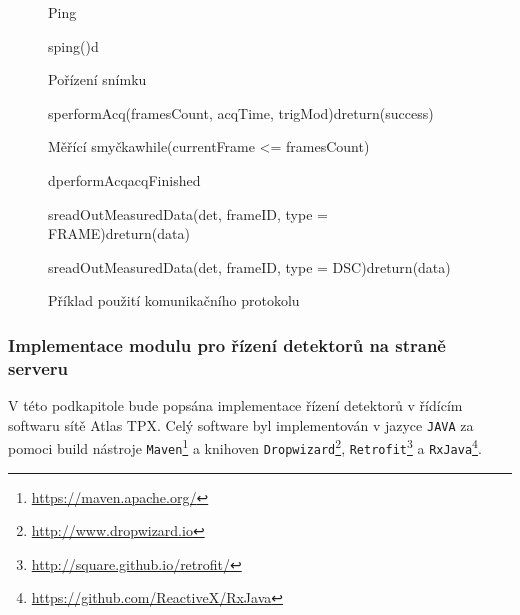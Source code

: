 \begin{figure}[t]
	\begin{center}
		\begin{sequencediagram}
			\begin{sdblock}{Ping}{}
				\begin{call}{s}{ping()}{d}{}
				\end{call}
			\end{sdblock}
			\begin{sdblock}{Pořízení snímku}{}
				\begin{call}{s}{performAcq(framesCount, acqTime, trigMod)}{d}{return(success)}	
				\end{call}
				\begin{sdblock}{Měřící smyčka}{while(currentFrame <= framesCount)}
					\begin{callself}{d}{performAcq}{acqFinished}
					\end{callself}
					\begin{call}{s}{readOutMeasuredData(det, frameID, type = FRAME)}{d}{return(data)}
					\end{call}
					\begin{call}{s}{readOutMeasuredData(det, frameID, type = DSC)}{d}{return(data)}
					\end{call}
				\end{sdblock}
			\end{sdblock}
		\end{sequencediagram}
		\caption{Příklad použití komunikačního protokolu}
		\label{fig:uml:com_priklad}
	\end{center}
\end{figure}


\subsubsection{Implementace modulu pro řízení detektorů na straně serveru}
V této podkapitole bude popsána implementace řízení detektorů v řídícím softwaru sítě Atlas TPX. Celý software byl implementován v jazyce \texttt{JAVA} za pomoci build nástroje \texttt{Maven}\footnote{\url{https://maven.apache.org/}} a knihoven \texttt{Dropwizard}\footnote{\url{http://www.dropwizard.io}}, \texttt{Retrofit}\footnote{\url{http://square.github.io/retrofit/}} a \texttt{RxJava}\footnote{\url{https://github.com/ReactiveX/RxJava}}.

